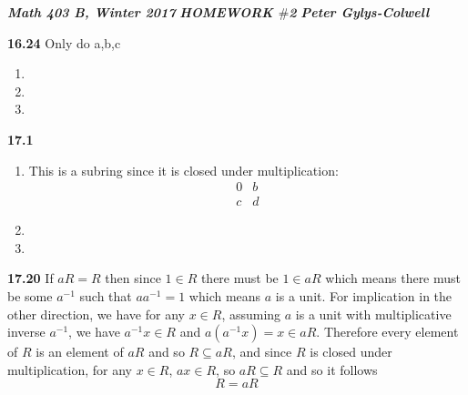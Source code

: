 \documentclass[12pt]{article}
\newenvironment{ques}{\vspace{2 ex}}{\vspace{2 ex}}
\theoremstyle{definition}
\begin{document}
\noindent \textit{\textbf{Math 403 B, Winter 2017}} \hspace{1.3cm}
\textit{\textbf{HOMEWORK $\#$2}} \hspace{1.3cm} \textit{\textbf{Peter
Gylys-Colwell}} 

\vspace{1cm}

\begin{ques}
	\textbf{16.24} Only do a,b,c
	\begin{enumerate}
		\item

		\item

		\item

	\end{enumerate}
\end{ques}

\begin{ques}
	\textbf{17.1}
	\begin{enumerate}
		\item
		This is a subring since it is closed under multiplication:
		$$\begin{matrix} 0 & b \\ c & d \end{matrix} $$

		\item

		\item

	\end{enumerate}
\end{ques}

\begin{ques}
	\textbf{17.20}
	If $aR = R$ then since $1 \in R$ there must be $1 \in aR$ which means
	there must be some $a^{-1}$ such that $aa^{-1} =1$ which means $a$ is a
	unit. For implication in the other direction, we have for any $x \in
	R$, assuming $a$ is a unit with multiplicative inverse $a^{-1}$, we
	have $a^{-1}x \in R$ and $a (a^{-1}x) = x \in aR$. Therefore every element of
	$R$ is an element of $aR$ and so $R \subseteq aR$, and since $R$ is
	closed under multiplication, for any $x \in R$, $ax \in R$, so $aR
	\subseteq R$ and so it follows 
	$$R = aR$$
\end{ques}
\end{document}

